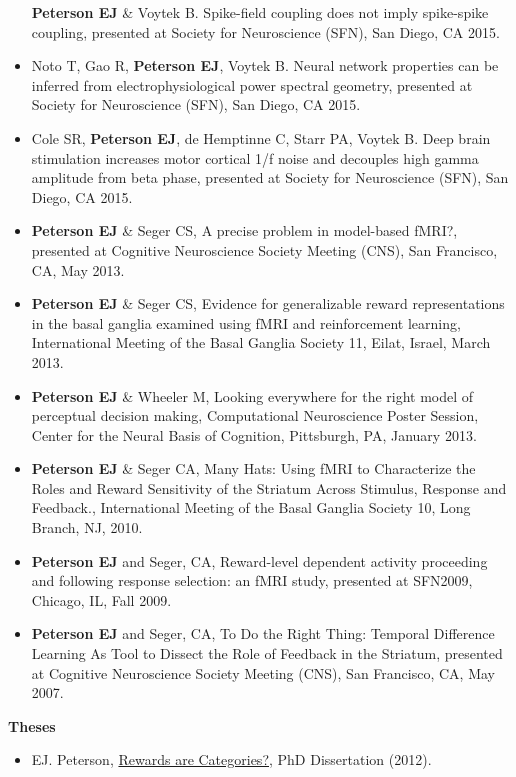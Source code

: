 \begin{itemize}
  \textbf{Peterson EJ} \& Voytek B. Spike-field coupling does not imply
  spike-spike coupling, presented at Society for Neuroscience (SFN), San
  Diego, CA 2015.
\item
  Noto T, Gao R, \textbf{Peterson EJ}, Voytek B. Neural network
  properties can be inferred from electrophysiological power spectral
  geometry, presented at Society for Neuroscience (SFN), San Diego, CA
  2015.
\item
  Cole SR, \textbf{Peterson EJ}, de Hemptinne C, Starr PA, Voytek B.
  Deep brain stimulation increases motor cortical 1/f noise and
  decouples high gamma amplitude from beta phase, presented at Society
  for Neuroscience (SFN), San Diego, CA 2015.
\item
  \textbf{Peterson EJ} \& Seger CS, A precise problem in model-based
  fMRI?, presented at Cognitive Neuroscience Society Meeting (CNS), San
  Francisco, CA, May 2013.
\item
  \textbf{Peterson EJ} \& Seger CS, Evidence for generalizable reward
  representations in the basal ganglia examined using fMRI and
  reinforcement learning, International Meeting of the Basal Ganglia
  Society 11, Eilat, Israel, March 2013.
\item
  \textbf{Peterson EJ} \& Wheeler M, Looking everywhere for the right
  model of perceptual decision making, Computational Neuroscience Poster
  Session, Center for the Neural Basis of Cognition, Pittsburgh, PA,
  January 2013.
\item
  \textbf{Peterson EJ} \& Seger CA, Many Hats: Using fMRI to
  Characterize the Roles and Reward Sensitivity of the Striatum Across
  Stimulus, Response and Feedback., International Meeting of the Basal
  Ganglia Society 10, Long Branch, NJ, 2010.
\item
  \textbf{Peterson EJ} and Seger, CA, Reward-level dependent activity
  proceeding and following response selection: an fMRI study, presented
  at SFN2009, Chicago, IL, Fall 2009.
\item
  \textbf{Peterson EJ} and Seger, CA, To Do the Right Thing: Temporal
  Difference Learning As Tool to Dissect the Role of Feedback in the
  Striatum, presented at Cognitive Neuroscience Society Meeting (CNS),
  San Francisco, CA, May 2007.
\end{itemize}

\textbf{Theses}

\begin{itemize}
\tightlist
\item
  EJ. Peterson,
  \href{https://github.com/parenthetical-e/dissertation}{Rewards are
  Categories?}, PhD Dissertation (2012).
\end{itemize}

